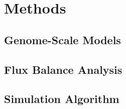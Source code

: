 \section{Methods}\label{sec:methods}

\subsection{Genome-Scale Models}\label{ssec:genome_scale_models}

\subsection{Flux Balance Analysis}\label{ssec:flux_balance_analysis}

\subsection{Simulation Algorithm}

